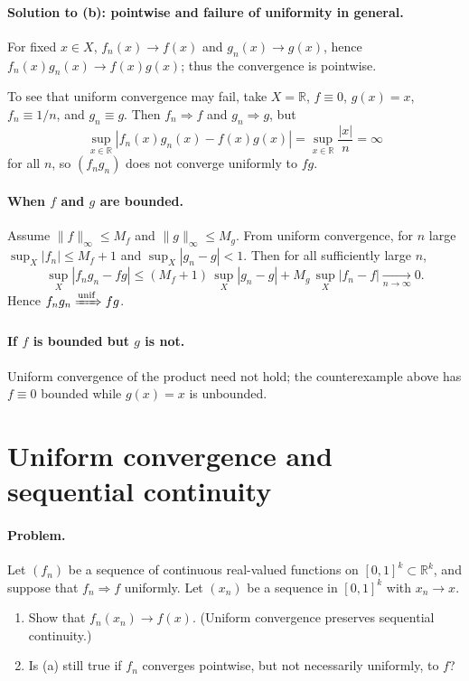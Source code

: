 \documentclass[12pt,a4paper]{article}
\begin{document}
\paragraph{Solution to (b): pointwise and failure of uniformity in general.}
For fixed $x\in X$, $f_n(x)\to f(x)$ and $g_n(x)\to g(x)$, hence $f_n(x)g_n(x)\to f(x)g(x)$; thus the convergence is pointwise.

To see that uniform convergence may fail, take $X=\mathbb{R}$, $f\equiv 0$, $g(x)=x$, $f_n\equiv 1/n$, and $g_n\equiv g$. Then $f_n\Rightarrow f$ and $g_n\Rightarrow g$, but
\[
\sup_{x\in\mathbb{R}} |f_n(x)g_n(x)-f(x)g(x)|=\sup_{x\in\mathbb{R}}\frac{|x|}{n}=\infty
\]
for all $n$, so $(f_n g_n)$ does not converge uniformly to $fg$.

\paragraph{When $f$ and $g$ are bounded.}
Assume $\|f\|_\infty\le M_f$ and $\|g\|_\infty\le M_g$. From uniform convergence, for $n$ large
\(
\sup_X|f_n|\le M_f+1
\)
and
\(
\sup_X|g_n-g|<1.
\)
Then for all sufficiently large $n$,
\[
\sup_X |f_n g_n - fg|
\le (M_f+1)\,\sup_X|g_n-g| + M_g\,\sup_X|f_n-f| \xrightarrow[n\to\infty]{} 0.
\]
Hence $f_n g_n \xRightarrow{\text{\rm unif}} fg$.

\paragraph{If $f$ is bounded but $g$ is not.}
Uniform convergence of the product need not hold; the counterexample above has $f\equiv 0$ bounded while $g(x)=x$ is unbounded.

\section*{Uniform convergence and sequential continuity}

\paragraph{Problem.}
Let $(f_n)$ be a sequence of continuous real-valued functions on $[0,1]^k\subset\mathbb{R}^k$, and suppose that $f_n \Rightarrow f$ uniformly. Let $(x_n)$ be a sequence in $[0,1]^k$ with $x_n\to x$.
\begin{enumerate}[label=(\alph*)]
\item Show that $f_n(x_n)\to f(x)$. (Uniform convergence preserves sequential continuity.)
\item Is (a) still true if $f_n$ converges pointwise, but not necessarily uniformly, to $f$?
\end{enumerate}
\end{document}
